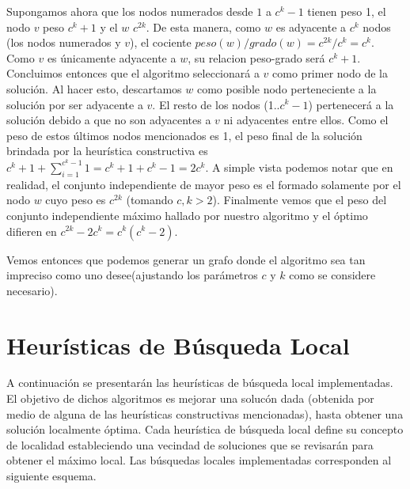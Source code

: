 \documentclass[a4paper,11pt] {article}
\begin{document}
Supongamos ahora que los nodos numerados desde $1$ a $c^{k}-1$ tienen peso 1, el nodo $v$ peso $c^{k}+1$ y el $w$ $c^{2k}$. De esta manera, como $w$ es adyacente a $c^{k}$ nodos (los nodos numerados y $v$), el cociente $peso(w)/grado(w)=c^{2k}/c^{k}=c^{k}$. Como $v$ es \'unicamente adyacente a $w$, su relacion peso-grado ser\'a $c^{k}+1$. Concluimos entonces que el algoritmo seleccionar\'a a $v$ como primer nodo de la soluci\'on. Al hacer esto, descartamos $w$ como posible nodo perteneciente a la soluci\'on por ser adyacente a $v$. El resto de los nodos (1..$c^{k}-1$) pertenecer\'a a la soluci\'on debido a que no son adyacentes a $v$ ni adyacentes entre ellos. Como el peso de estos \'ultimos nodos mencionados es 1, el peso final de la soluci\'on brindada por la heur\'istica constructiva es $c^{k}+1+\sum_{i=1}^{c^{k}-1}1=c^{k}+1+c^{k}-1=2c^{k}$. A simple vista podemos notar que en realidad, el conjunto independiente de mayor peso es el formado solamente por el nodo $w$ cuyo peso es $c^{2k}$ (tomando $c,k>2$). Finalmente vemos que el peso del conjunto independiente m\'aximo hallado por nuestro algoritmo y el \'optimo difieren en $c^{2k}-2c^{k}=c^{k}(c^{k}-2)$.

Vemos entonces que podemos generar un grafo donde el algoritmo sea tan impreciso como uno desee(ajustando los par\'ametros $c$ y $k$ como se considere necesario).

\bigskip
\section{Heur\'isticas de B\'usqueda Local}

A continuaci\'on se presentar\'an las heur\'isticas de b\'usqueda local implementadas. El objetivo de dichos algoritmos es mejorar una soluc\'on dada (obtenida por medio de alguna de las heur\'isticas constructivas mencionadas), hasta obtener una soluci\'on localmente \'optima. Cada heur\'istica de b\'usqueda local define su concepto de localidad estableciendo una vecindad de soluciones que se revisar\'an para obtener el m\'aximo local. Las b\'usquedas locales implementadas corresponden al siguiente esquema.
\end{document}
